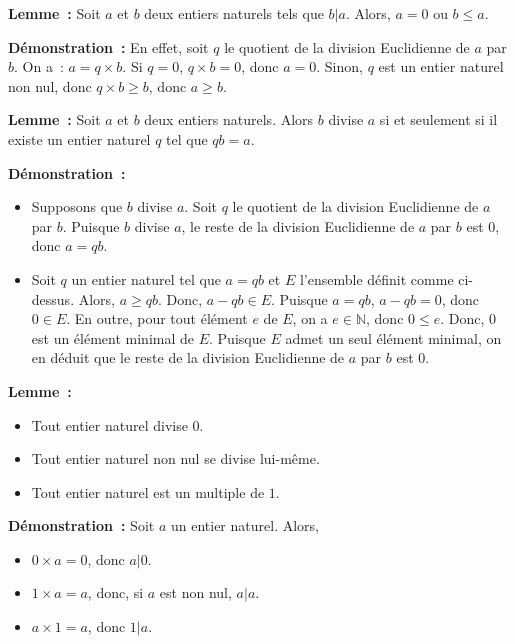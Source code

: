 \medskip

\noindent\textbf{Lemme :} 
    Soit $a$ et $b$ deux entiers naturels tels que $b \vert a$.
    Alors, $a = 0$ ou $b \leq a$.

\medskip

\noindent\textbf{Démonstration :} 
    En effet, soit $q$ le quotient de la division Euclidienne de $a$ par $b$. 
    On a : $a = q \times b$.
    Si $q = 0$, $q \times b = 0$, donc $a = 0$.
    Sinon, $q$ est un entier naturel non nul, donc $q \times b \geq b$, donc $a \geq b$.

    \done

\medskip

\noindent\textbf{Lemme :} Soit $a$ et $b$ deux entiers naturels. 
    Alors $b$ divise $a$ si et seulement si il existe un entier naturel $q$ tel que $q b = a$.

\medskip

\noindent\textbf{Démonstration :} 
    \begin{itemize}[nosep]
        \item Supposons que $b$ divise $a$. 
            Soit $q$ le quotient de la division Euclidienne de $a$ par $b$. 
            Puisque $b$ divise $a$, le reste de la division Euclidienne de $a$ par $b$ est $0$, donc $a = q b$.
        \item Soit $q$ un entier naturel tel que $a = q b$ et $E$ l'ensemble définit comme ci-dessus.
            Alors, $a \geq q b$.
            Donc, $a - q b \in E$.
            Puisque $a = q b$, $a - q b = 0$, donc $0 \in E$. 
            En outre, pour tout élément $e$ de $E$, on a $e \in \mathbb{N}$, donc $0 \leq e$.
            Donc, $0$ est un élément minimal de $E$. 
            Puisque $E$ admet un seul élément minimal, on en déduit que le reste de la division Euclidienne de $a$ par $b$ est $0$.
    \end{itemize}

    \done

\medskip

\noindent\textbf{Lemme :} 
\begin{itemize}[nosep]
    \item Tout entier naturel divise $0$.
    \item Tout entier naturel non nul se divise lui-même. 
    \item Tout entier naturel est un multiple de $1$.
\end{itemize}

\medskip

\noindent\textbf{Démonstration :}
Soit $a$ un entier naturel. 
Alors, 
\begin{itemize}[nosep]
    \item $0 \times a = 0$, donc $a \vert 0$.
    \item $1 \times a = a$, donc, si $a$ est non nul, $a \vert a$. 
    \item $a \times 1 = a$, donc $1 \vert a$.
\end{itemize}

